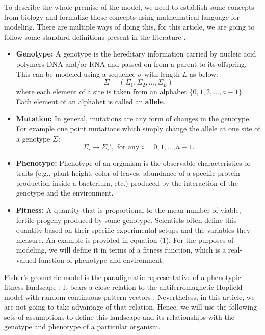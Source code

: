 \documentclass[11pt]{article}
\begin{document}
To describe the whole premise of the model, we need to establish some concepts from biology and formalize those concepts using mathematical language for modeling. There are multiple ways of doing this, for this article, we are going to follow some standard definitions present in the literature \cite{pahujani2025complexity, tenaillon2014utility}.

\begin{itemize}
    \item \textbf{Genotype:} A genotype is the hereditary information carried by nucleic acid polymers DNA and/or RNA and passed on from a parent to its  offspring. This can be modeled using a sequence $\sigma$ with length $L$ as below:
    \begin{equation*}
        \Sigma = (\Sigma_1 , \Sigma_2, \hdots , \Sigma_L)
    \end{equation*}
    where each element of a site is taken from an alphabet $\{0, 1, 2, \hdots, a-1\}$. Each element of an alphabet is called an \textbf{allele}. 
    \item \textbf{Mutation:} In general, mutations are any form of changes in the genotype. For example one point mutations which simply change the allele at one site of a genotype $\Sigma$:
    \begin{equation*}
        \Sigma_i \to \Sigma_i' , \text{ for any } i={0, 1, \hdots, a-1}.
    \end{equation*}
    \item \textbf{Phenotype:} Phenotype of an organism is the observable characteristics or traits (e.g., plant height, color of leaves, abundance of a specific protein production inside a bacterium, etc.) produced by the interaction of the genotype and the environment. 
    \item \textbf{Fitness:} A quantity that is proportional to the mean number of viable, fertile progeny produced by some genotype. Scientists often define this quantity based on their specific experimental setups and the variables they measure. An example is provided in equation (1). For the purposes of modeling, we will define it in terms of a fitness function, which is a real-valued function of phenotype and environment.     
\end{itemize}
Fisher's geometric model is the paradigmatic representative of a phenotypic fitness landscape \cite{orr2005genetic}; it bears a close relation to the antiferromagnetic Hopfield model with random continuous pattern vectors \cite{park2020distribution}. Nevertheless, in this article, we are not going to take advantage of that relation. Hence, we will use the following sets of assumptions to define this landscape and its relationships with the genotype and phenotype of a particular organism.
\end{document}
